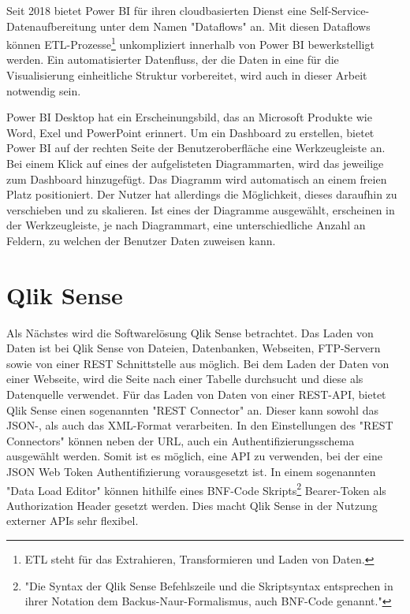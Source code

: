 Seit 2018 bietet Power BI für ihren cloudbasierten Dienst eine Self-Service-Datenaufbereitung unter dem Namen "Dataflows" an.\cite{MicrosoftDataflowsPreview}
Mit diesen Dataflows können ETL-Prozesse\footnote{ETL steht für das Extrahieren, Transformieren und Laden von Daten.}
unkompliziert innerhalb von Power BI bewerkstelligt werden. Ein automatisierter Datenfluss,
der die Daten in eine für die Visualisierung einheitliche Struktur vorbereitet, wird auch in dieser
Arbeit notwendig sein.

Power BI Desktop hat ein Erscheinungsbild, das an Microsoft Produkte wie Word, Exel und
PowerPoint erinnert. Um ein Dashboard zu erstellen, bietet Power BI auf der rechten Seite
der Benutzeroberfläche eine Werkzeugleiste an. Bei einem Klick auf eines der aufgelisteten
Diagrammarten, wird das jeweilige zum Dashboard hinzugefügt. Das Diagramm wird 
automatisch an einem freien Platz positioniert. Der Nutzer hat allerdings die Möglichkeit,
dieses daraufhin zu verschieben und zu skalieren. Ist eines der Diagramme ausgewählt,
erscheinen in der Werkzeugleiste, je nach Diagrammart, eine unterschiedliche Anzahl an Feldern,
zu welchen der Benutzer Daten zuweisen kann.

\section{Qlik Sense}
\label{sec:qliksense}
Als Nächstes wird die Softwarelösung Qlik Sense betrachtet.
Das Laden von Daten ist bei Qlik Sense von Dateien, Datenbanken, Webseiten, FTP-Servern sowie von einer
REST Schnittstelle aus möglich. Bei dem Laden der Daten von einer Webseite, wird die Seite nach einer Tabelle
durchsucht und diese als Datenquelle verwendet.\cite[S. 17]{QlikSenseCookbook} Für das Laden von Daten von
einer REST-API, bietet Qlik Sense einen sogenannten "REST Connector" an. Dieser kann sowohl das \mbox{JSON-,} als auch
das XML-Format verarbeiten. In den Einstellungen des "REST Connectors" können neben der URL, auch ein
Authentifizierungsschema ausgewählt werden.\cite[S. 23]{QlikSenseCookbook} Somit ist es möglich,
eine API zu verwenden, bei der eine JSON Web Token Authentifizierung vorausgesetzt ist. In einem sogenannten
"Data Load Editor" können hithilfe eines BNF-Code Skripts\footnote{"Die Syntax der Qlik Sense Befehlszeile
und die Skriptsyntax entsprechen in ihrer Notation dem Backus-Naur-Formalismus, auch BNF-Code genannt."\cite{QlikSenseScriptLanguage}}
Bearer-Token als Authorization Header gesetzt werden. Dies macht Qlik Sense in der Nutzung externer
APIs sehr flexibel.

